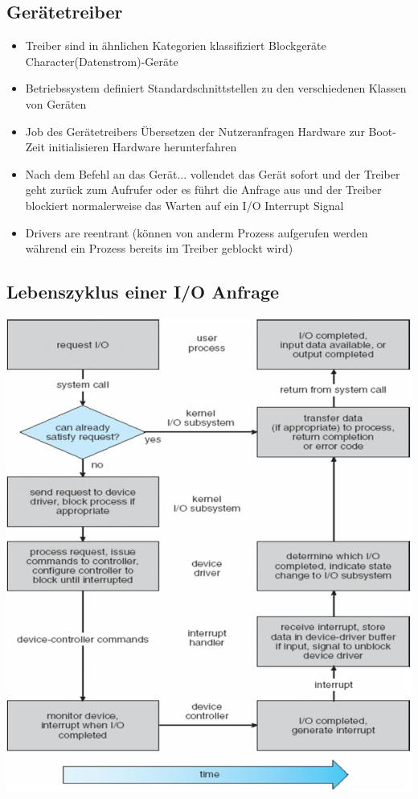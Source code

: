 \documentclass[a4paper]{scrreprt}
\begin{document}
\subsection{Gerätetreiber}
	\begin{itemize}
		\item Treiber sind in ähnlichen Kategorien klassifiziert
		\subitem Blockgeräte
		\subitem Character(Datenstrom)-Geräte
		\item Betriebssystem definiert Standardschnittstellen zu den verschiedenen Klassen von Geräten
		\item Job des Gerätetreibers 
			\subitem Übersetzen der Nutzeranfragen
			\subitem Hardware zur Boot-Zeit initialisieren 
			\subitem Hardware herunterfahren
		\item Nach dem Befehl an das Gerät...
			\subitem vollendet das Gerät sofort und der Treiber geht zurück zum Aufrufer
			\subitem oder es führt die Anfrage aus und der Treiber blockiert normalerweise das Warten auf ein I/O Interrupt Signal

		\item Drivers are reentrant (können von anderm Prozess aufgerufen werden während ein Prozess bereits im Treiber geblockt wird)
	\end{itemize}
\subsection{Lebenszyklus einer I/O Anfrage}
	\includegraphics[scale=0.35]{graphics/chapter9_10.png}
\end{document}
